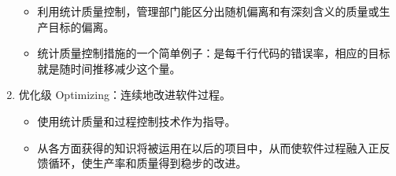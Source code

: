 \begin{enumerate}[label=\arabic*.]
\begin{itemize}
        \item 利用统计质量控制，管理部门能区分出随机偏离和有深刻含义的质量或生产目标的偏离。
        \item 统计质量控制措施的一个简单例子：是每千行代码的错误率，相应的目标就是随时间推移减少这个量。
    \end{itemize}
    \item 优化级 Optimizing：连续地改进软件过程。
    \begin{itemize}
        \item 使用统计质量和过程控制技术作为指导。
        \item 从各方面获得的知识将被运用在以后的项目中，从而使软件过程融入正反馈循环，使生产率和质量得到稳步的改进。
    \end{itemize}
\end{enumerate}

